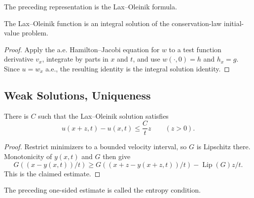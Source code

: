 \begin{definition}
\label{def:lax-oleinik-formula}

The preceding representation is the Lax--Oleinik formula.
\end{definition}

\begin{theorem}
\label{thm:lax-oleinik-integral-solution}

The Lax--Oleinik function is an integral solution of the conservation-law
initial-value problem.
\end{theorem}

\begin{proof}
\sketch Apply the a.e. Hamilton--Jacobi equation for $w$ to a test function
derivative $v_x$, integrate by parts in $x$ and $t$, and use $w(\cdot,0)=h$
and $h_x=g$. Since $u=w_x$ a.e., the resulting identity is the integral
solution identity.
\end{proof}

\subsection{Weak Solutions, Uniqueness}
\label{sec:conservation-laws-entropy-uniqueness}

\begin{lemma}
\label{lem:lax-oleinik-entropy-estimate}

There is $C$ such that the Lax--Oleinik solution satisfies
\[
u(x+z,t)-u(x,t)\le\frac Ct z\qquad(z>0).
\]
\end{lemma}

\begin{proof}
\sketch Restrict minimizers to a bounded velocity interval, so $G$ is
Lipschitz there. Monotonicity of $y(x,t)$ and $G$ then give
\[
G((x-y(x,t))/t)\ge G((x+z-y(x+z,t))/t)-\operatorname{Lip}(G)z/t.
\]
This is the claimed estimate.
\end{proof}

\begin{definition}
\label{def:entropy-condition-inequality}

The preceding one-sided estimate is called the entropy condition.
\end{definition}

